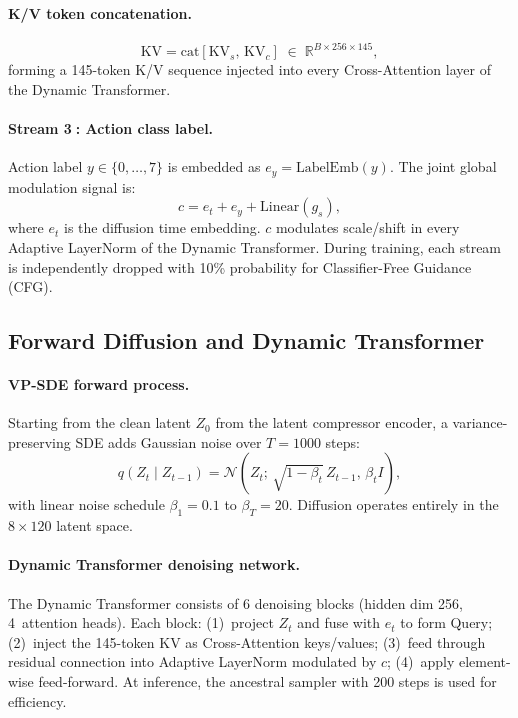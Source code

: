 \documentclass{article}
\newcommand{\Rbb}{\mathbb{R}}
\begin{document}
\paragraph{K/V token concatenation.}
\begin{equation}
  \mathrm{KV}
    = \mathrm{cat}[\mathrm{KV}_s,\,\mathrm{KV}_c]
    \;\in\;\Rbb^{B\times256\times145},
\end{equation}
forming a 145-token K/V sequence injected into every Cross-Attention layer of
the Dynamic Transformer.

\paragraph{Stream \textcircled{3}: Action class label.}
Action label $y\!\in\!\{0,\ldots,7\}$ is embedded as
$e_y\!=\!\mathrm{LabelEmb}(y)$.
The joint global modulation signal is:
\begin{equation}
  c = e_t + e_y + \mathrm{Linear}(g_s),
\end{equation}
where $e_t$ is the diffusion time embedding.
$c$ modulates scale/shift in every Adaptive LayerNorm of the Dynamic Transformer.
During training, each stream is independently dropped with 10\% probability for
Classifier-Free Guidance (CFG).

\subsection{Forward Diffusion and Dynamic Transformer}
\label{sec:diffusion}

\paragraph{VP-SDE forward process.}
Starting from the clean latent $Z_0$ from the latent compressor encoder, a
variance-preserving SDE adds Gaussian noise over $T\!=\!1000$ steps:
\begin{equation}
  q(Z_t\mid Z_{t-1})
    = \mathcal{N}\!\left(Z_t;\,\sqrt{1-\beta_t}\,Z_{t-1},\,\beta_t I\right),
\end{equation}
with linear noise schedule $\beta_1\!=\!0.1$ to $\beta_T\!=\!20$.
Diffusion operates entirely in the $8\!\times\!120$ latent space.

\paragraph{Dynamic Transformer denoising network.}
The Dynamic Transformer consists of 6 denoising blocks (hidden dim 256,
4~attention heads).
Each block: (1)~project $Z_t$ and fuse with $e_t$ to form Query;
(2)~inject the 145-token $\mathrm{KV}$ as Cross-Attention keys/values;
(3)~feed through residual connection into Adaptive LayerNorm modulated by $c$;
(4)~apply element-wise feed-forward.
At inference, the ancestral sampler with 200 steps is used for efficiency.
\end{document}

